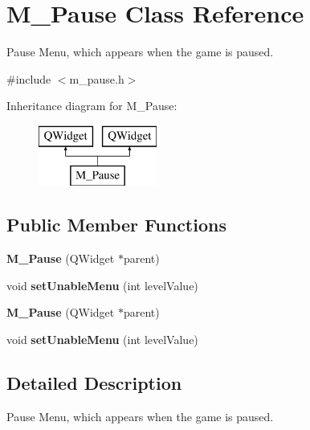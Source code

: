 \hypertarget{class_m___pause}{}\section{M\+\_\+\+Pause Class Reference}
\label{class_m___pause}


Pause Menu, which appears when the game is paused.  




{\ttfamily \#include $<$m\+\_\+pause.\+h$>$}

Inheritance diagram for M\+\_\+\+Pause\+:\begin{figure}[H]
\begin{center}
\leavevmode
\includegraphics[height=2.000000cm]{class_m___pause}
\end{center}
\end{figure}
\subsection*{Public Member Functions}
\begin{DoxyCompactItemize}
\item 
\hypertarget{class_m___pause_ac1cb95e28d9c158d4dfdba4a08491432}{}{\bfseries M\+\_\+\+Pause} (Q\+Widget $\ast$parent)\label{class_m___pause_ac1cb95e28d9c158d4dfdba4a08491432}

\item 
\hypertarget{class_m___pause_a1c4c4a10f597d250973481b81d575e14}{}void {\bfseries set\+Unable\+Menu} (int level\+Value)\label{class_m___pause_a1c4c4a10f597d250973481b81d575e14}

\item 
\hypertarget{class_m___pause_ac1cb95e28d9c158d4dfdba4a08491432}{}{\bfseries M\+\_\+\+Pause} (Q\+Widget $\ast$parent)\label{class_m___pause_ac1cb95e28d9c158d4dfdba4a08491432}

\item 
\hypertarget{class_m___pause_a1c4c4a10f597d250973481b81d575e14}{}void {\bfseries set\+Unable\+Menu} (int level\+Value)\label{class_m___pause_a1c4c4a10f597d250973481b81d575e14}

\end{DoxyCompactItemize}


\subsection{Detailed Description}
Pause Menu, which appears when the game is paused. 


